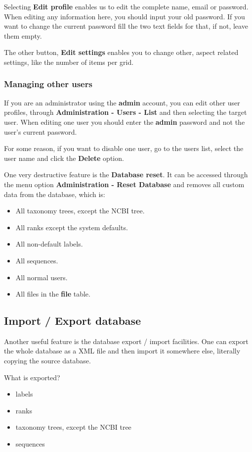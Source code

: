 Selecting \textbf{Edit profile} enables us to edit the complete name, email or password.
When editing any information here, you should input your old password. If you want to change
the current password fill the two text fields for that, if not, leave them empty.

The other button, \textbf{Edit settings} enables you to change other, aspect related settings, like
the number of items per grid.

\subsubsection{Managing other users}

If you are an administrator using the \textbf{admin} account, you can edit other user profiles,
through \textbf{Administration - Users - List} and then selecting the target user. When editing
one user you should enter the \textbf{admin} password and not the user's current password.

For some reason, if you want to disable one user, go to the users list, select the user name
and click the \textbf{Delete} option.

One very destructive feature is the \textbf{Database reset}. It
can be accessed through the menu option \textbf{Administration - Reset Database} and removes all
custom data from the database, which is:

\begin{itemize}
  \item All taxonomy trees, except the NCBI tree.
  \item All ranks except the system defaults.
  \item All non-default labels.
  \item All sequences.
  \item All normal users.
  \item All files in the \textbf{file} table.
\end{itemize}

\subsection{Import / Export database}

Another useful feature is the database export / import facilities. One can
export the whole database as a XML file and then import it somewhere else, literally copying
the source database.

What is exported?

\begin{itemize}
  \item labels
  \item ranks
  \item taxonomy trees, except the NCBI tree
  \item sequences
\end{itemize}

